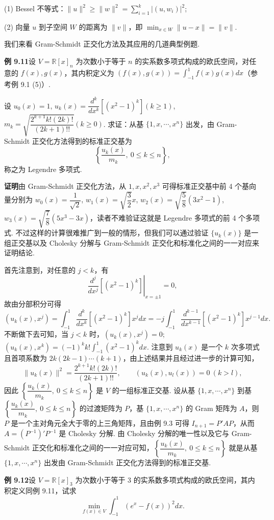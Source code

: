 \documentclass[UTF8, 12pt, fontset=fandol, oneside]{ctexart}
\begin{document}
(1) Bessel 不等式：$\|u\|^2\ge \|w\|^2=\sum_{i=1}^k |(u,w_i)|^2$;

(2) 向量 $u$ 到子空间 $W$ 的距离为 $\|v\|$，即 $\min_{x\in W}\|u-x\|=\|v\|$.

我们来看 Gram-Schmidt 正交化方法及其应用的几道典型例题.

\noindent\textbf{例 9.11}\quad 设 $V=\mathbb{R}[x]_n$ 为次数小于等于 $n$ 的实系数多项式构成的欧氏空间，对任意的 $f(x),g(x)$，其内积定义为 $(f(x),g(x))=\int_{-1}^1 f(x)g(x)dx$（参考例 9.1 (5)）.

设 $u_0(x)=1$, $u_k(x)=\dfrac{d^k}{dx^k}\left[(x^2-1)^k\right](k\ge 1)$, $m_k=\sqrt{\dfrac{2^{k+1}k!(2k)!}{(2k+1)!!}}(k\ge 0)$. 求证：从基 $\{1,x,\cdots,x^n\}$ 出发，由 Gram-Schmidt 正交化方法得到的标准正交基为
\[
\left\{\frac{u_k(x)}{m_k},\ 0\le k\le n\right\},
\]
称之为 Legendre 多项式.

\noindent\textbf{证明}\quad 由 Gram-Schmidt 正交化方法，从 $1,x,x^2,x^3$ 可得标准正交基中前 4 个基向量分别为 $w_0(x)=\dfrac1{\sqrt2}$, $w_1(x)=\sqrt{\dfrac32}x$, $w_2(x)=\sqrt{\dfrac58}(3x^2-1)$, $w_3(x)=\sqrt{\dfrac78}(5x^3-3x)$，读者不难验证这就是 Legendre 多项式的前 4 个多项式. 不过这样的计算很难推广到一般的情形，但我们可以通过验证 $\{u_k(x)\}$ 是一组正交基以及 Cholesky 分解与 Gram-Schmidt 正交化和标准化之间的一一对应来证明结论.

首先注意到，对任意的 $j<k$，有
\[
\left.\frac{d^j}{dx^j}\left[(x^2-1)^k\right]\right|_{x=\pm1}=0,
\]
故由分部积分可得
\[
(u_k(x),x^j)=\int_{-1}^1 \frac{d^k}{dx^k}\left[(x^2-1)^k\right]x^jdx
=-j\int_{-1}^1 \frac{d^{k-1}}{dx^{k-1}}\left[(x^2-1)^k\right]x^{j-1}dx.
\]
不断做下去可知，当 $j<k$ 时，$(u_k(x),x^j)=0$; $(u_k(x),x^k)=(-1)^kk!\int_{-1}^1 (x^2-1)^kdx$. 注意到 $u_k(x)$ 是一个 $k$ 次多项式且首项系数为 $2k(2k-1)\cdots(k+1)$，由上述结果并且经过进一步的计算可知，
\[
\|u_k(x)\|^2=\frac{2^{k+1}k!(2k)!}{(2k+1)!!},\qquad (u_k(x),u_l(x))=0\ (k>l),
\]
因此 $\left\{\dfrac{u_k(x)}{m_k},\ 0\le k\le n\right\}$ 是 $V$ 的一组标准正交基. 设从基 $\{1,x,\cdots,x^n\}$ 到基 $\left\{\dfrac{u_k(x)}{m_k},\ 0\le k\le n\right\}$ 的过渡矩阵为 $P$，基 $\{1,x,\cdots,x^n\}$ 的 Gram 矩阵为 $A$，则 $P$ 是一个主对角元全大于零的上三角矩阵，且由例 9.3 可得 $I_{n+1}=P'AP$，从而 $A=(P^{-1})'P^{-1}$ 是 Cholesky 分解. 由 Cholesky 分解的唯一性以及它与 Gram-Schmidt 正交化和标准化之间的一一对应可知，$\left\{\dfrac{u_k(x)}{m_k},\ 0\le k\le n\right\}$ 就是从基 $\{1,x,\cdots,x^n\}$ 出发由 Gram-Schmidt 正交化方法得到的标准正交基.

\noindent\textbf{例 9.12}\quad 设 $V=\mathbb{R}[x]_3$ 为次数小于等于 3 的实系数多项式构成的欧氏空间，其内积定义同例 9.11，试求
\[
\min_{f(x)\in V}\int_{-1}^1 (e^x-f(x))^2dx.
\]
\end{document}
